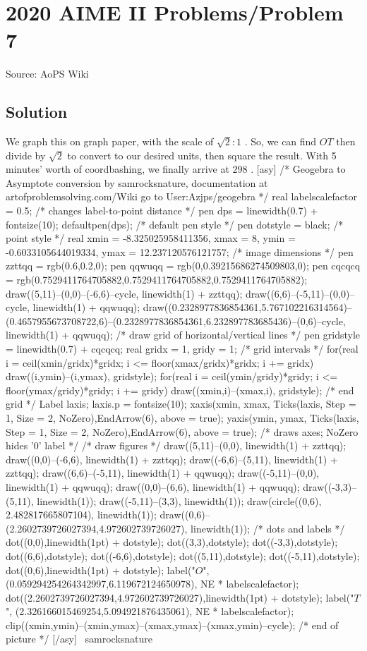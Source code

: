 \documentclass[12pt]{article}
\begin{document}
\section*{{2020 AIME II Problems/Problem 7}}
Source: AoPS Wiki

\subsection*{Solution}
We graph this on graph paper, with the scale of $\sqrt{2}:1$ . So, we can find $OT$ then divide by $\sqrt{2}$ to convert to our desired units, then square the result. With 5 minutes' worth of coordbashing, we finally arrive at $298$ . [asy] /* Geogebra to Asymptote conversion by samrocksnature, documentation at artofproblemsolving.com/Wiki go to User:Azjps/geogebra */ real labelscalefactor = 0.5; /* changes label-to-point distance */ pen dps = linewidth(0.7) + fontsize(10); defaultpen(dps); /* default pen style */ pen dotstyle = black; /* point style */ real xmin = -8.325025958411356, xmax = 8, ymin = -0.6033105644019334, ymax = 12.237120576121757; /* image dimensions */ pen zzttqq = rgb(0.6,0.2,0); pen qqwuqq = rgb(0,0.39215686274509803,0); pen cqcqcq = rgb(0.7529411764705882,0.7529411764705882,0.7529411764705882); draw((5,11)--(0,0)--(-6,6)--cycle, linewidth(1) + zzttqq); draw((6,6)--(-5,11)--(0,0)--cycle, linewidth(1) + qqwuqq); draw((0.2328977836854361,5.767102216314564)--(0.4657955673708722,6)--(0.2328977836854361,6.232897783685436)--(0,6)--cycle, linewidth(1) + qqwuqq); /* draw grid of horizontal/vertical lines */ pen gridstyle = linewidth(0.7) + cqcqcq; real gridx = 1, gridy = 1; /* grid intervals */ for(real i = ceil(xmin/gridx)*gridx; i <= floor(xmax/gridx)*gridx; i += gridx) draw((i,ymin)--(i,ymax), gridstyle); for(real i = ceil(ymin/gridy)*gridy; i <= floor(ymax/gridy)*gridy; i += gridy) draw((xmin,i)--(xmax,i), gridstyle); /* end grid */ Label laxis; laxis.p = fontsize(10); xaxis(xmin, xmax, Ticks(laxis, Step = 1, Size = 2, NoZero),EndArrow(6), above = true); yaxis(ymin, ymax, Ticks(laxis, Step = 1, Size = 2, NoZero),EndArrow(6), above = true); /* draws axes; NoZero hides '0' label */ /* draw figures */ draw((5,11)--(0,0), linewidth(1) + zzttqq); draw((0,0)--(-6,6), linewidth(1) + zzttqq); draw((-6,6)--(5,11), linewidth(1) + zzttqq); draw((6,6)--(-5,11), linewidth(1) + qqwuqq); draw((-5,11)--(0,0), linewidth(1) + qqwuqq); draw((0,0)--(6,6), linewidth(1) + qqwuqq); draw((-3,3)--(5,11), linewidth(1)); draw((-5,11)--(3,3), linewidth(1)); draw(circle((0,6), 2.482817665807104), linewidth(1)); draw((0,6)--(2.2602739726027394,4.972602739726027), linewidth(1)); /* dots and labels */ dot((0,0),linewidth(1pt) + dotstyle); dot((3,3),dotstyle); dot((-3,3),dotstyle); dot((6,6),dotstyle); dot((-6,6),dotstyle); dot((5,11),dotstyle); dot((-5,11),dotstyle); dot((0,6),linewidth(1pt) + dotstyle); label("$O$", (0.059294254264342997,6.119672124650978), NE * labelscalefactor); dot((2.2602739726027394,4.972602739726027),linewidth(1pt) + dotstyle); label("$T$", (2.326166015469254,5.094921876435061), NE * labelscalefactor); clip((xmin,ymin)--(xmin,ymax)--(xmax,ymax)--(xmax,ymin)--cycle); /* end of picture */ [/asy] ~samrocksnature
\end{document}
